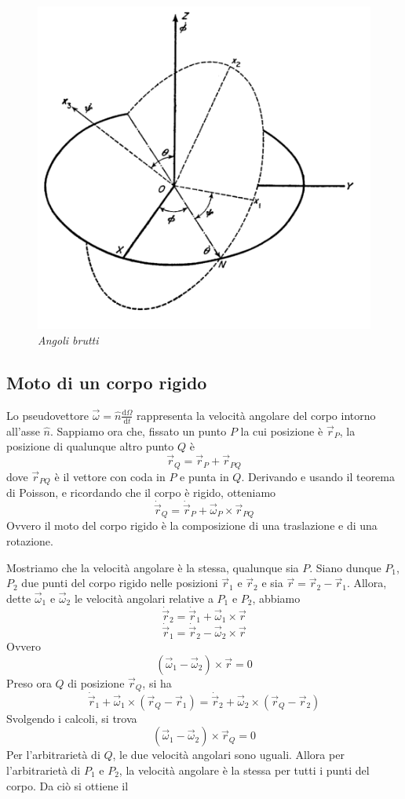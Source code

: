 \documentclass[a4paper,11pt]{article}
\begin{document}
\begin{figure}
	\centering
	\includegraphics[scale=0.37]{angoli_eulero.png}
	\caption{\textit{Angoli brutti}\label{Eulero}}
\end{figure}

\subsection{Moto di un corpo rigido}

Lo pseudovettore $\vec{\omega}=\hat{n}\frac{\mathrm{d}\Omega}{\mathrm{d}t}$ rappresenta la velocità angolare del corpo intorno all'asse $\hat{n}$. Sappiamo ora che, fissato un punto $P$ la cui posizione è $\vec{r}_P$, la posizione di qualunque altro punto $Q$ è
\[\vec{r}_Q=\vec{r}_P+\vec{r}_{PQ}\]
dove $\vec{r}_{PQ}$ è il vettore con coda in $P$ e punta in $Q$. Derivando e usando il teorema di Poisson, e ricordando che il corpo è rigido, otteniamo
\[\dot{\vec{r}}_Q=\dot{\vec{r}}_P+\vec \omega_P\times\vec{r}_{PQ}\]
Ovvero il moto del corpo rigido è la composizione di una traslazione e di una rotazione. 

\noindent Mostriamo che la velocità angolare è la stessa, qualunque sia $P$. Siano dunque $P_1$, $P_2$ due punti del corpo rigido nelle posizioni $\vec{r}_1$ e $\vec{r}_2$ e sia $\vec{r}=\vec{r}_2-\vec{r}_1$. Allora, dette $\vec \omega_1$ e $\vec \omega_2$ le velocità angolari relative a $P_1$ e $P_2$, abbiamo 
\[\dot{\vec{r}}_2=\dot{\vec{r}}_1+\vec{\omega}_1\times\vec{r}\]
\[\dot{\vec{r}}_1=\dot{\vec{r}}_2-\vec{\omega}_2\times\vec{r}\]
Ovvero
\[\left(\vec{\omega}_1-\vec{\omega}_2\right)\times\vec{r}=0\]
Preso ora $Q$ di posizione $\vec{r}_Q$, si ha
\[\dot{\vec{r}}_1+\vec{\omega}_1\times\left(\vec{r}_Q-\vec{r}_1\right)=\dot{\vec{r}}_2+\vec{\omega}_2\times\left(\vec{r}_Q-\vec{r}_2\right)\]
Svolgendo i calcoli, si trova
\[\left(\vec{\omega}_1-\vec{\omega}_2\right)\times\vec{r}_Q=0\]
Per l'arbitrarietà di $Q$, le due velocità angolari sono uguali. Allora per l'arbitrarietà di $P_1$ e $P_2$, la velocità angolare è la stessa per tutti i punti del corpo. Da ciò si ottiene il
\end{document}
